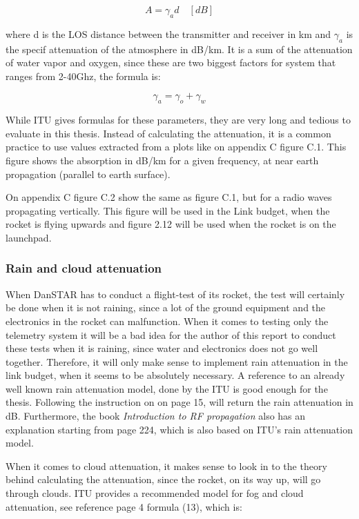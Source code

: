 \begin{equation}
    A = \gamma_ad \quad [dB]
\end{equation}

where d is the LOS distance between the transmitter and receiver in km and $\gamma_a$ is the specif attenuation of the atmosphere in dB/km. It is a sum of the attenuation of water vapor and oxygen, since these are two biggest factors for system that ranges from 2-40Ghz, the formula is:

\begin{equation}
    \gamma_a = \gamma_o + \gamma_w
\end{equation}

While ITU gives formulas for these parameters, they are very long and tedious to evaluate in this thesis. Instead of calculating the attenuation, it is a common practice to use values extracted from a plots like on appendix C figure C.1. This figure shows the absorption in dB/km for a given frequency, at near earth propagation (parallel to earth surface). 

On appendix C figure C.2 show the same as figure C.1, but for a radio waves propagating vertically. This figure will be used in the Link budget, when the rocket is flying upwards and figure 2.12 will be used when the rocket is on the launchpad.

\subsubsection{Rain and cloud attenuation}
When DanSTAR has to conduct a flight-test of its rocket, the test will certainly be done when it is not raining, since a lot of the ground equipment and the electronics in the rocket can malfunction. When it comes to testing only the telemetry system it will be a bad idea for the author of this report to conduct these tests when it is raining, since water and electronics does not go well together. Therefore, it will only make sense to implement rain attenuation in the link budget, when it seems to be absolutely necessary. A reference to an already well known rain attenuation model, done by the ITU is good enough for the thesis. Following the instruction on \cite{ITURain} on page 15, will return the rain attenuation in dB. Furthermore, the book \textit{Introduction to RF propagation} also has an explanation starting from page 224, which is also based on ITU's rain attenuation model.

When it comes to cloud attenuation, it makes sense to look in to the theory behind calculating the attenuation, since the rocket, on its way up, will go through clouds. ITU provides a recommended model for fog and cloud attenuation, see reference \cite{ITUCloud} page 4 formula (13), which is: 

